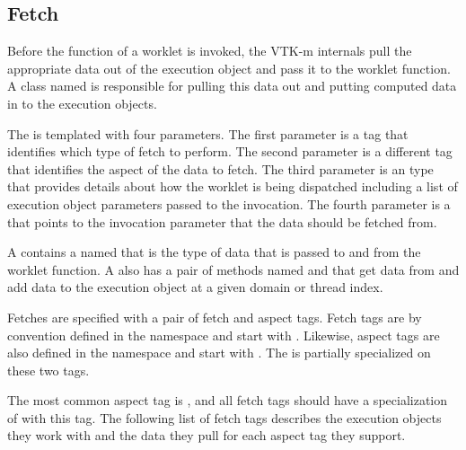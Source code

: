 \subsection{Fetch}
\label{sec:Fetch}


Before the function of a worklet is invoked, the VTK-m internals pull the
appropriate data out of the execution object and pass it to the worklet
function. A class named  is responsible for pulling this
data out and putting computed data in to the execution objects.

The   is templated with four
parameters. The first parameter is a tag that identifies which type of
fetch to perform. The second parameter is a different tag that identifies
the aspect of the data to fetch. The third parameter is an
 type that provides details about how the
worklet is being dispatched including a list of execution object parameters
passed to the invocation. The fourth parameter is a  that
points to the invocation parameter that the data should be fetched from.

A  contains a  named
 that is the type of data that is passed to and from
the worklet function. A  also has a pair of methods
named  and  that get data from and add data
to the execution object at a given domain or thread index.


Fetches are specified with a pair of fetch and aspect tags. Fetch tags are by
convention defined in the \vtkmexecarg{} namespace and start with
. Likewise, aspect tags are also defined in the
\vtkmexecarg{} namespace and start with . The
  is partially specialized on these
two tags.

 The most common aspect tag is
, and all fetch tags should have a
specialization of  with this tag. The following list of
fetch tags describes the execution objects they work with and the data they
pull for each aspect tag they support.


